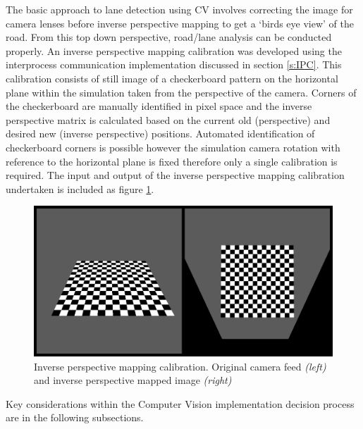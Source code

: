 \documentclass[]{aiaa-tc}%
\begin{document}

The basic approach to lane detection using CV involves correcting the image for camera lenses before inverse perspective mapping to get a `birds eye view' of the road. From this top down perspective, road/lane analysis can be conducted properly. An inverse perspective mapping calibration was developed using the interprocess communication implementation discussed in section \ref{s:IPC}. This calibration consists of still image of a checkerboard pattern on the horizontal plane within the simulation taken from the perspective of the camera. Corners of the checkerboard are manually identified in pixel space and the inverse perspective matrix is calculated based on the current old (perspective) and desired new (inverse perspective) positions. Automated identification of checkerboard corners is possible however the simulation camera rotation with reference to the horizontal plane is fixed therefore only a single calibration is required. The input and output of the inverse perspective mapping calibration undertaken is included as figure \ref{f:inverse_perspective_calibration}.

\begin{figure}[htb]%
	\includegraphics{InversePerspectiveEg.png}
	\caption{Inverse perspective mapping calibration. Original camera feed \textit{(left)} and inverse perspective mapped image \textit{(right)}}
	\label{f:inverse_perspective_calibration}
\end{figure}

Key considerations within the Computer Vision implementation decision process are in the following subsections.
\end{document}
